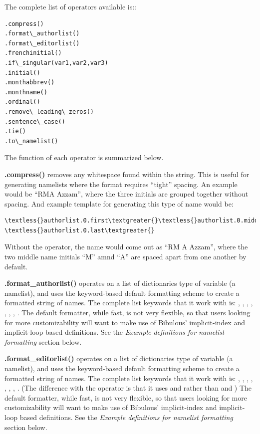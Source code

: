 \documentclass[letterpaper,10pt,english]{sphinxmanual}
\begin{document}
The complete list of operators available is::

\begin{Verbatim}[commandchars=\\\{\}]
.compress()
.format\_authorlist()
.format\_editorlist()
.frenchinitial()
.if\_singular(var1,var2,var3)
.initial()
.monthabbrev()
.monthname()
.ordinal()
.remove\_leading\_zeros()
.sentence\_case()
.tie()
.to\_namelist()
\end{Verbatim}

The function of each operator is summarized below.

\textbf{.compress()} removes any whitespace found within the string. This is useful for generating namelists where the format requires ``tight'' spacing. An example would be ``RMA Azzam'', where the three initials are grouped together without spacing. And example template for generating this type of name would be:

\begin{Verbatim}[commandchars=\\\{\}]
\textless{}authorlist.0.first\textgreater{}\textless{}authorlist.0.middle.initial().compress()\textgreater{} \textless{}authorlist.0.last\textgreater{}
\end{Verbatim}

Without the  operator, the name would come out as ``RM A Azzam'', where the two middle name initials ``M'' amnd ``A'' are spaced apart from one another by default.

\textbf{.format\_authorlist()} operates on a list of dictionaries type of variable (a namelist), and uses the keyword-based default formatting scheme to create a formatted string of names. The complete list keywords that it work with is: , , , , , , , . The default formatter, while fast, is not very flexible, so that users looking for more customizability will want to make use of Bibulous' implicit-index and implicit-loop based definitions. See the \emph{Example definitions for namelist formatting} section below.

\textbf{.format\_editorlist()} operates on a list of dictionaries type of variable (a namelist), and uses the keyword-based default formatting scheme to create a formatted string of names.  The complete list keywords that it work with is: , , , , , , , . (The difference with the  operator is that it uses  and  rather than  and ) The default formatter, while fast, is not very flexible, so that users looking for more customizability will want to make use of Bibulous' implicit-index and implicit-loop based definitions. See the \emph{Example definitions for namelist formatting} section below.
\end{document}
